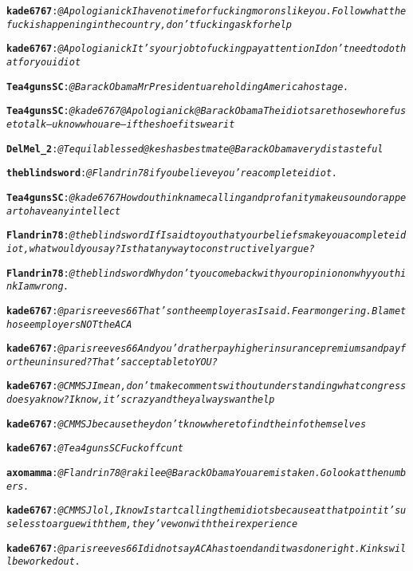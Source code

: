 \begin{alltt}
\textbf{kade6767}: \emph{@Apologianick I have no time for fucking morons like you. Follow what the fuck is happening in the country, don't fucking ask for help}

\textbf{kade6767}: \emph{@Apologianick It's your job to fucking pay attention I don't need to do that for you idiot}

\textbf{Tea4gunsSC}: \emph{@BarackObama Mr President u are holding America hostage.}

\textbf{Tea4gunsSC}: \emph{@kade6767 @Apologianick @BarackObama The idiots are those who refuse to talk---u know who u are--if the shoe fits wear it}

\textbf{DelMel_2}: \emph{@Tequilablessed @keshasbestmate @BarackObama very distasteful}

\textbf{theblindsword}: \emph{@Flandrin78 if you believe you're a complete idiot.}

\textbf{Tea4gunsSC}: \emph{@kade6767 How do u think name calling and profanity make u sound or appear to have any intellect}

\textbf{Flandrin78}: \emph{@theblindsword If I said to you that your beliefs make you a complete idiot, what would you say?  Is that any way to constructively argue?}

\textbf{Flandrin78}: \emph{@theblindsword Why don't you come back with your opinion on why you think I am wrong.}

\textbf{kade6767}: \emph{@parisreeves66 That's on the employer as I said. Fear mongering. Blame those employers NOT the ACA}

\textbf{kade6767}: \emph{@parisreeves66 And you'd rather pay higher insurance premiums and pay for the uninsured? That's acceptable to YOU?}

\textbf{kade6767}: \emph{@CMMSJ I mean, don't make comments without understanding what congress does ya know? I know, it's crazy and they always want help}

\textbf{kade6767}: \emph{@CMMSJ because they don't know where to find the info themselves}

\textbf{kade6767}: \emph{@Tea4gunsSC Fuck off cunt}

\textbf{axomamma}: \emph{@Flandrin78 @rakilee @BarackObama You are mistaken. Go look at the numbers.}

\textbf{kade6767}: \emph{@CMMSJ lol, I know I start calling them idiots because at that point it's useless to argue with them, they've won with their experience}

\textbf{kade6767}: \emph{@parisreeves66 I did not say ACA has to end and it was done right. Kinks will be worked out.}


\end{alltt}
